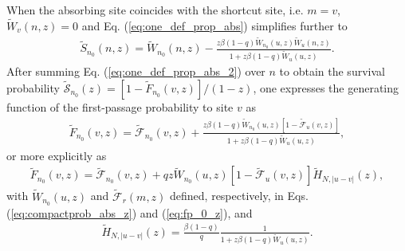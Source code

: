 \documentclass[superscriptaddress, amsmath, amssymb, aps, pre, floatfix]{revtex4-2}
\begin{document}
When the absorbing site coincides with the shortcut site, i.e. $m=v$, $\widetilde{W}_{v}(n,z)=0$ and Eq. (\ref{eq:one_def_prop_abs}) simplifies further to
\begin{align}
\widetilde{S}_{n_0}(n,z)=\widetilde{W}_{n_0}(n,z)-\frac{z\beta (1-q)\widetilde{W}_{n_0}(u,z)\widetilde{W}_{u}(n,z)}{1+z\beta(1-q)\widetilde{W}_{u}(u,z)}.
\label{eq:one_def_prop_abs_2}
\end{align}
After summing Eq. (\ref{eq:one_def_prop_abs_2}) over $n$ to obtain the survival probability $\widetilde{\mathcal{S}}_{n_0}(z)=\left[1-\widetilde{F}_{n_0}(v,z)\right]/(1-z)$, one expresses the generating function of the first-passage probability to site $v$ as
\begin{align}
\widetilde{F}_{n_0}(v,z)=\widetilde{\mathcal{F}}_{n_0}(v,z)+\frac{z\beta (1-q)\widetilde{W}_{n_0}(u,z)\left[1-\widetilde{\mathcal{F}}_{u}(v,z)\right]}{1+z\beta(1-q)\widetilde{W}_{u}(u,z)},
\label{eq:first_pass_prob}
\end{align}
or more explicitly as
\begin{align}
\widetilde{F}_{n_0}(v,z)=\widetilde{\mathcal{F}}_{n_0}(v,z)+qz\widetilde{W}_{n_0}(u,z)\left[1-\widetilde{\mathcal{F}}_{u}(v,z)\right] \widetilde{H}_{N,|u-v|}(z),
\label{eq:first_pass_prob_2}
\end{align}
with $\widetilde{W}_{n_0}(u,z)$ and $\widetilde{\mathcal{F}}_{r}(m,z)$ defined, respectively, in Eqs. (\ref{eq:compactprob_abs_z}) and (\ref{eq:fp_0_z}), and
 \begin{align}
  \widetilde{H}_{N,|u-v|}(z)=\frac{\beta(1-q)}{q}\frac{1}{1+z\beta(1-q)\widetilde{W}_{u}(u,z)}.
\label{eq:HNuv}
\end{align}
\end{document}
